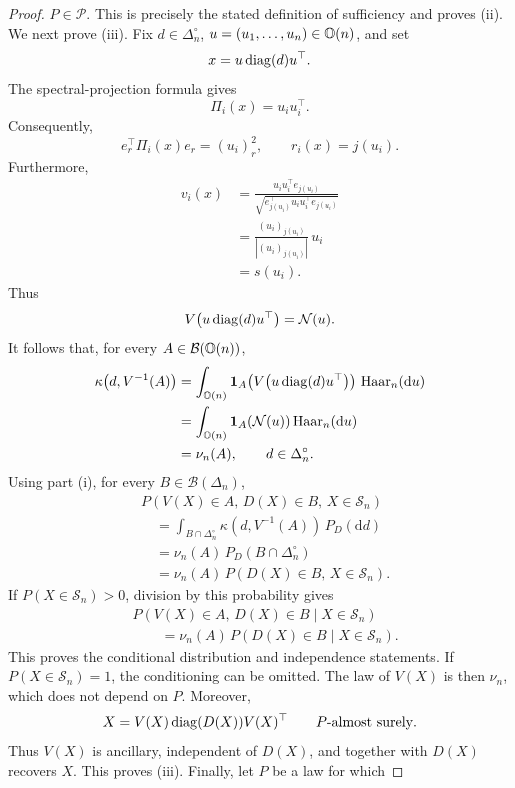 \begin{proof}
\(P\in\mathcal P\). This is precisely the stated definition of
sufficiency and proves (ii).
We next prove (iii). Fix \(d\in\Delta_n^\circ\),
\(u=(u_1,\ldots,u_n)\in\mathbb{O}(n)\), and set
\[
x=u\operatorname{diag}(d)u^\top.
\]
The spectral-projection formula gives
\[
\Pi_i(x)=u_i u_i^\top.
\]
Consequently,
\[
e_r^\top\Pi_i(x)e_r=(u_i)_r^2,
\qquad
r_i(x)=j(u_i).
\]
Furthermore,
\[
\begin{aligned}
v_i(x)
&=
\frac{u_i u_i^\top e_{j(u_i)}}
{\sqrt{
e_{j(u_i)}^\top u_i u_i^\top e_{j(u_i)}
}} \\
&=
\frac{(u_i)_{j(u_i)}}{|(u_i)_{j(u_i)}|}\,u_i \\
&=
s(u_i).
\end{aligned}
\]
Thus
\[
V\!\left(u\operatorname{diag}(d)u^\top\right)=\mathcal N(u).
\]
It follows that, for every \(A\in\mathcal B(\mathbb{O}(n))\),
\[
\begin{aligned}
\kappa\!\left(d,V^{-1}(A)\right)
&=
\int_{\mathbb{O}(n)}
\mathbf 1_A\!\left(
V\!\left(u\operatorname{diag}(d)u^\top\right)
\right)\,\mathrm{Haar}_n(\mathrm{d}u) \\
&=
\int_{\mathbb{O}(n)}
\mathbf 1_A(\mathcal N(u))\,\mathrm{Haar}_n(\mathrm{d}u) \\
&=
\nu_n(A),
\qquad d\in\Delta_n^\circ.
\end{aligned}
\]
Using part (i), for every \(B\in\mathcal B(\Delta_n)\),
\[
\begin{aligned}
&P\!\left(
V(X)\in A,\,
D(X)\in B,\,
X\in\mathcal S_n
\right) \\
&\quad=
\int_{B\cap\Delta_n^\circ}
\kappa\!\left(d,V^{-1}(A)\right)\,P_D(\mathrm{d}d) \\
&\quad=
\nu_n(A)\,P_D(B\cap\Delta_n^\circ) \\
&\quad=
\nu_n(A)\,
P\!\left(
D(X)\in B,\,
X\in\mathcal S_n
\right).
\end{aligned}
\]
If \(P(X\in\mathcal S_n)>0\), division by this probability gives
\[
\begin{aligned}
&P\!\left(
V(X)\in A,\,
D(X)\in B
\mid X\in\mathcal S_n
\right) \\
&\qquad=
\nu_n(A)\,
P\!\left(
D(X)\in B
\mid X\in\mathcal S_n
\right).
\end{aligned}
\]
This proves the conditional distribution and independence statements.
If \(P(X\in\mathcal S_n)=1\), the conditioning can be omitted. The
law of \(V(X)\) is then \(\nu_n\), which does not depend on \(P\).
Moreover,
\[
X=V(X)\operatorname{diag}(D(X))V(X)^\top
\qquad P\text{-almost surely}.
\]
Thus \(V(X)\) is ancillary, independent of \(D(X)\), and together
with \(D(X)\) recovers \(X\). This proves (iii).
Finally, let \(P\) be a law for which

\end{proof}
